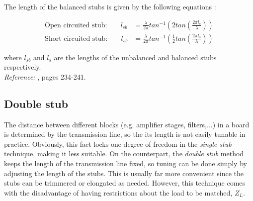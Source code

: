 \noindent The length of the balanced stubs is given by the following equations \cite{SanDiegoNotesMatching}:

\begin{align}
\text{Open circuited stub:} \;\;\;\;\;\;\; l_{sb} & = \frac{\lambda}{2\pi} tan^{-1} \left( 2 tan\left( \frac{2\pi l_s}{\lambda}\right)\right) \\
\text{Short circuited stub:}\;\;\;\;\;\;\; l_{sb} & = \frac{\lambda}{2\pi} tan^{-1} \left( \frac{1}{2} tan\left( \frac{2\pi l_s}{\lambda}\right)\right)
\end{align}

where $l_{sb}$ and $l_{s}$ are the lengths of the unbalanced and balanced stubs respectively.\\

\noindent \textit{Reference:} \cite{Pozar}, pages 234-241.


\subsection{Double stub}
The distance between different blocks (e.g. amplifier stages, filters,...) in a board is determined by the transmission line, so the its length is not easily tunable in practice. Obviously, this fact locks one degree of freedom in the \textit{single stub} technique, making it less suitable. On the counterpart, the \textit{double stub} method keeps the length of the transmission line fixed, so tuning can be done simply by adjusting the length of the stubs. This is usually far more convenient since the stubs can be trimmered or elongated as needed. However, this technique comes with the disadvantage of having restrictions about the load to be matched, $Z_L$.

